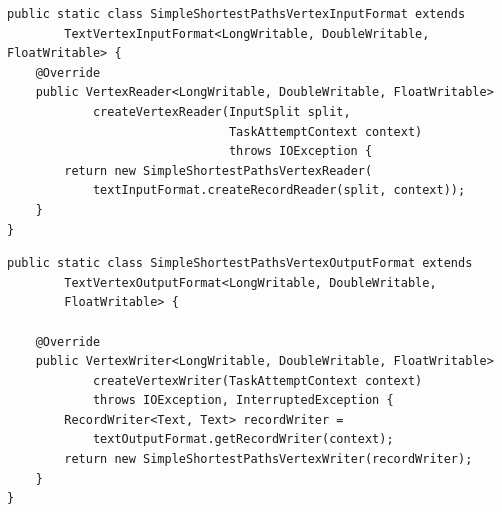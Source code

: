 \begin{lstlisting}[float]
public static class SimpleShortestPathsVertexInputFormat extends
        TextVertexInputFormat<LongWritable, DoubleWritable, FloatWritable> {
    @Override
    public VertexReader<LongWritable, DoubleWritable, FloatWritable>
            createVertexReader(InputSplit split,
                               TaskAttemptContext context)
                               throws IOException {
        return new SimpleShortestPathsVertexReader(
            textInputFormat.createRecordReader(split, context));
    }
}
\end{lstlisting}

\begin{lstlisting}[float]
public static class SimpleShortestPathsVertexOutputFormat extends
        TextVertexOutputFormat<LongWritable, DoubleWritable,
        FloatWritable> {

    @Override
    public VertexWriter<LongWritable, DoubleWritable, FloatWritable>
            createVertexWriter(TaskAttemptContext context)
            throws IOException, InterruptedException {
        RecordWriter<Text, Text> recordWriter =
            textOutputFormat.getRecordWriter(context);
        return new SimpleShortestPathsVertexWriter(recordWriter);
    }
}
\end{lstlisting}

